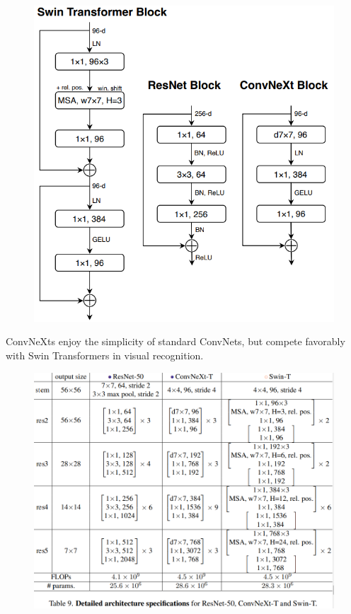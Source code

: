 \documentclass[11pt]{article}
\begin{document}
\begin{figure}[H]
	\centering
	\includegraphics[scale=0.5]{45}
\end{figure}

ConvNeXts enjoy the simplicity of standard ConvNets, but compete favorably with Swin Transformers in visual recognition.
\begin{figure}[H]
	\centering
	\includegraphics[scale=0.5]{46}
\end{figure}
\end{document}
